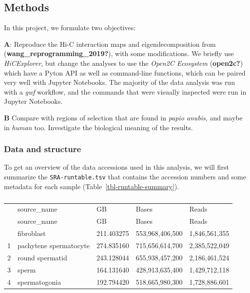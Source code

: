 \documentclass[
  a4paper,
  DIV=11,
  numbers=noendperiod]{scrarticle}
\begin{document}
\subsection{Methods}\label{methods}

In this project, we formulate two objectives:

\textbf{A}: Reproduce the Hi-C interaction maps and eigendecomposition
from (\textbf{wang\_reprogramming\_2019?}), with some modifications. We
briefly use \emph{HiCExplorer}, but change the analyses to use the
\emph{Open2C Ecosystem} (\textbf{open2c?}) which have a Pyton API as
well as command-line functions, which can be paired very well with
Jupyter Notebooks. The majority of the data analysis was run with a
\emph{gwf} workflow, and the commands that were visually inspected were
run in Jupyter Notebooks.

\textbf{B} Compare with regions of selection that are found in
\emph{papio anubis}, and maybe in \emph{human} too. Investigate the
biological meaning of the results.

\subsubsection{Data and structure}\label{data-and-structure}

\label{md-data-accessions}
To get an overview of the data accessions used in this analysis, we will
first summarize the \texttt{SRA-runtable.tsv} that contains the
accession numbers and some metadata for each sample
(Table~\ref{tbl-runtable-summary}).

\begin{longtable}[]{@{}lllll@{}}

\caption{\label{tbl-runtable-summary}Summary of the data accessions used
in this analysis}

\tabularnewline

\caption{}\label{T_0aa9c}\tabularnewline
\toprule\noalign{}
~ & source\_name & GB & Bases & Reads \\
\midrule\noalign{}
\endfirsthead
\toprule\noalign{}
~ & source\_name & GB & Bases & Reads \\
\midrule\noalign{}
\endhead
\bottomrule\noalign{}
\endlastfoot
0 & fibroblast & 211.403275 & 553,968,406,500 & 1,846,561,355 \\
1 & pachytene spermatocyte & 274.835160 & 715,656,614,700 &
2,385,522,049 \\
2 & round spermatid & 243.128044 & 655,938,457,200 & 2,186,461,524 \\
3 & sperm & 164.131640 & 428,913,635,400 & 1,429,712,118 \\
4 & spermatogonia & 192.794420 & 518,665,980,300 & 1,728,886,601 \\

\end{longtable}
\end{document}
